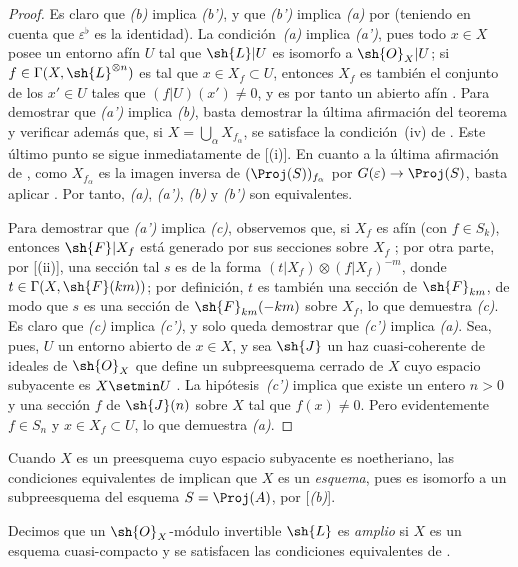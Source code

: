 \documentclass[oneside,10pt]{amsart}
\makeatletter
\newcommand{\ega@arrow}[2]{\mathchoice{#1}{#2}{#2}{#2}}
\renewcommand{\to}{\ega@arrow{\longrightarrow}{\rightarrow}}
\let\EGAOriginalLabel\label
\renewcommand{\label}[1]{\phantomsection\EGAOriginalLabel{#1}}
\makeatother
\begin{document}
\begin{proof}
Es claro que \emph{(b)} implica \emph{(b')}, y que \emph{(b')} implica \emph{(a)} por  (teniendo en cuenta que $\varepsilon^\flat$ es la identidad).
La condición~\emph{(a)} implica \emph{(a')}, pues todo $x\in X$ posee un entorno afín $U$ tal que $\sh{L}|U$ es isomorfo a $\sh{O}_X|U$;
si $f\in\Gamma(X,\sh{L}^{\otimes n})$ es tal que $x\in X_f\subset U$, entonces $X_f$ es también el conjunto de los $x'\in U$ tales que $(f|U)(x')\neq0$, y es por tanto un abierto afín .
Para demostrar que \emph{(a')} implica \emph{(b)}, basta demostrar la última afirmación del teorema y verificar además que, si $X=\bigcup_\alpha X_{f_\alpha}$, se satisface la condición~(iv) de .
Este último punto se sigue inmediatamente de [(i)].
En cuanto a la última afirmación de , como $X_{f_\alpha}$ es la imagen inversa de $(\Proj(S))_{f_\alpha}$ por $G(\varepsilon)\to\Proj(S)$, basta aplicar .
Por tanto, \emph{(a)}, \emph{(a')}, \emph{(b)} y \emph{(b')} son equivalentes.

Para demostrar que \emph{(a')} implica \emph{(c)}, observemos que, si $X_f$ es afín (con $f\in S_k$), entonces $\sh{F}|X_f$ está generado por sus secciones sobre $X_f$ ;
por otra parte, por [(ii)], una sección tal $s$ es de la forma $(t|X_f)\otimes(f|X_f)^{-m}$, donde $t\in\Gamma(X,\sh{F}(km))$;
por definición, $t$ es también una sección de $\sh{F}_{km}$, de modo que $s$ es una sección de $\sh{F}_{km}(-km)$ sobre $X_f$, lo que demuestra \emph{(c)}.
Es claro que \emph{(c)} implica \emph{(c')}, y solo queda demostrar que \emph{(c')} implica \emph{(a)}.
Sea, pues, $U$ un entorno abierto de $x\in X$, y sea $\sh{J}$ un haz cuasi-coherente de ideales de $\sh{O}_X$ que define un subpreesquema cerrado de $X$ cuyo espacio subyacente es $X\setmin U$ .
La hipótesis~\emph{(c')} implica que existe un entero $n>0$ y una sección $f$ de $\sh{J}(n)$ sobre $X$ tal que $f(x)\neq0$.
Pero evidentemente $f\in S_n$ y $x\in X_f\subset U$, lo que demuestra \emph{(a)}.
\end{proof}

Cuando $X$ es un preesquema cuyo espacio subyacente es noetheriano, las condiciones equivalentes de  implican que $X$ es un \emph{esquema}, pues es isomorfo a un subpreesquema del esquema $S=\Proj(A)$, por [\emph{(b)}].

\begin{definition}[4.5.3]
\label{II.4.5.3}
Decimos que un $\sh{O}_X$-módulo invertible $\sh{L}$ es \emph{amplio} si $X$ es un esquema cuasi-compacto y se satisfacen las condiciones equivalentes de .
\end{definition}
\end{document}
